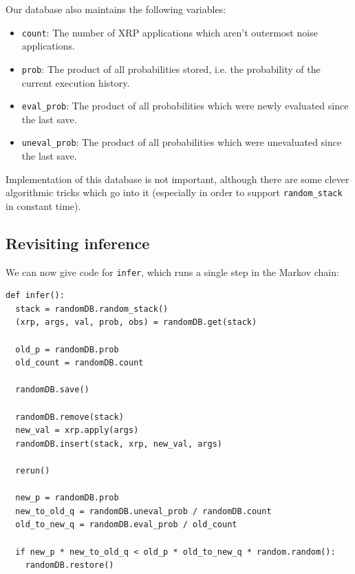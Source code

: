\documentclass[11pt]{article}
\begin{document}
Our database also maintains the following variables:
\begin{itemize}
\item {\tt count}:  The number of XRP applications which aren't outermost noise applications.
\item {\tt prob}:  The product of all probabilities stored, i.e. the probability of the current execution history.
\item {\tt eval\_prob}:  The product of all probabilities which were newly evaluated since the last save.
\item {\tt uneval\_prob}:  The product of all probabilities which were unevaluated since the last save.
\end{itemize}

Implementation of this database is not important, although there are some clever algorithmic tricks which go into it (especially in order to support {\tt random\_stack} in constant time).  %

\subsection{Revisiting inference}

We can now give code for {\tt infer}, which runs a single step in the Markov chain:

\begin{small}
\begin{verbatim}
def infer():
  stack = randomDB.random_stack()
  (xrp, args, val, prob, obs) = randomDB.get(stack)

  old_p = randomDB.prob
  old_count = randomDB.count

  randomDB.save()

  randomDB.remove(stack)
  new_val = xrp.apply(args)
  randomDB.insert(stack, xrp, new_val, args)

  rerun()
  
  new_p = randomDB.prob
  new_to_old_q = randomDB.uneval_prob / randomDB.count
  old_to_new_q = randomDB.eval_prob / old_count
  
  if new_p * new_to_old_q < old_p * old_to_new_q * random.random():
    randomDB.restore()
\end{verbatim}
\end{small}
\end{document}
